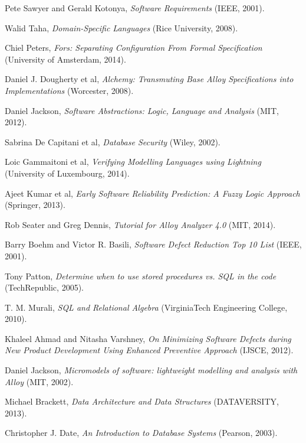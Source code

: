 \documentclass[oneside]{book}
\begin{document}
\begin{thebibliography}{9}

  Pete Sawyer and Gerald Kotonya, 
  \emph{Software Requirements} (IEEE, 2001).
  
  Walid Taha, 
  \emph{Domain-Specific Languages} (Rice University, 2008).
  
  Chiel Peters, 
  \emph{Fors: Separating Configuration From Formal Specification} (University of Amsterdam, 2014).
  
  Daniel J. Dougherty et al, 
  \emph{Alchemy: Transmuting Base Alloy Specifications
into Implementations} (Worcester, 2008).

  Daniel Jackson, 
  \emph{Software Abstractions: Logic, Language and Analysis} (MIT, 2012).
  
  Sabrina De Capitani et al, 
  \emph{Database Security} (Wiley, 2002).
  
  Loic Gammaitoni et al, 
  \emph{Verifying Modelling Languages using Lightning} (University of Luxembourg, 2014).

  Ajeet Kumar et al, 
  \emph{Early Software Reliability Prediction: A Fuzzy Logic Approach} (Springer, 2013).
  
  Rob Seater and Greg Dennis, 
  \emph{Tutorial for Alloy Analyzer 4.0} (MIT, 2014).
  
  Barry Boehm and Victor R. Basili, 
  \emph{Software Defect Reduction Top 10 List} (IEEE, 2001).
  
  Tony Patton, 
  \emph{Determine when to use stored procedures vs. SQL in the code} (TechRepublic, 2005).  
  
  T. M. Murali, 
  \emph{SQL and Relational Algebra} (VirginiaTech Engineering College, 2010).   
  
  Khaleel Ahmad and Nitasha Varshney, 
  \emph{On Minimizing Software Defects during New Product Development Using Enhanced Preventive Approach} (IJSCE, 2012).

  Daniel Jackson, 
  \emph{Micromodels of software: lightweight modelling and analysis with Alloy} (MIT, 2002).

  Michael Brackett, 
  \emph{Data Architecture and Data Structures} (DATAVERSITY, 2013).  
 
  Christopher J. Date, 
  \emph{An Introduction to Database Systems} (Pearson, 2003).  


\end{thebibliography}
\end{document}
